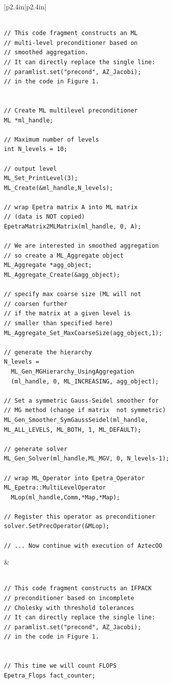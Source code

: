 \documentclass[acmtoms,acmnow]{acmtrans2m}
\begin{document}
\begin{figure}
{\scriptsize
\begin{tabular}{|p{2.4in}|p{2.4in}|}\hline
\begin{verbatim}

// This code fragment constructs an ML
// multi-level preconditioner based on 
// smoothed aggregation.
// It can directly replace the single line:
// paramlist.set("precond", AZ_Jacobi);
// in the code in Figure 1.


// Create ML multilevel preconditioner
ML *ml_handle;

// Maximum number of levels
int N_levels = 10;

// output level
ML_Set_PrintLevel(3);
ML_Create(&ml_handle,N_levels);

// wrap Epetra matrix A into ML matrix 
// (data is NOT copied)
EpetraMatrix2MLMatrix(ml_handle, 0, A);

// We are interested in smoothed aggregation
// so create a ML_Aggregate object
ML_Aggregate *agg_object;
ML_Aggregate_Create(&agg_object);

// specify max coarse size (ML will not 
// coarsen further 
// if the matrix at a given level is
// smaller than specified here)
ML_Aggregate_Set_MaxCoarseSize(agg_object,1);

// generate the hierarchy
N_levels = 
  ML_Gen_MGHierarchy_UsingAggregation
  (ml_handle, 0, ML_INCREASING, agg_object);

// Set a symmetric Gauss-Seidel smoother for 
// MG method (change if matrix  not symmetric)
ML_Gen_Smoother_SymGaussSeidel(ml_handle, 
ML_ALL_LEVELS, ML_BOTH, 1, ML_DEFAULT);

// generate solver
ML_Gen_Solver(ml_handle,ML_MGV, 0, N_levels-1);

// wrap ML_Operator into Epetra_Operator
ML_Epetra::MultiLevelOperator  
  MLop(ml_handle,Comm,*Map,*Map);

// Register this operator as preconditioner
solver.SetPrecOperator(&MLop);

// ... Now continue with execution of AztecOO
\end{verbatim}
&
\begin{verbatim}

// This code fragment constructs an IFPACK
// preconditioner based on incomplete
// Cholesky with threshold tolerances
// It can directly replace the single line:
// paramlist.set("precond", AZ_Jacobi);
// in the code in Figure 1.


// This time we will count FLOPS
Epetra_Flops fact_counter;


\end{verbatim}
\end{tabular}}
\end{figure}
\end{document}

